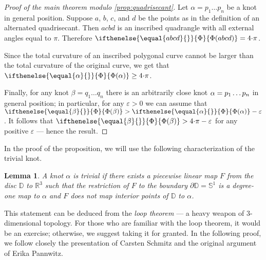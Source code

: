 \documentclass{article}
\newcommand*{\z}[1]{#1\nobreak\discretionary{}%
            {\hbox{$\mathsurround=0pt #1$}}{}}
\theoremstyle{theorem}
\newtheorem{Crofton-type formula}[theorem]{Crofton-type formula}
\newtheorem{Lemma}[theorem]{Lemma}
\newtheorem{Douglas--Rado theorem}[theorem]{Douglas--Rado theorem}
\newtheorem{Extended monotonicity theorem}[theorem]{Extended monotonicity theorem}
\theoremstyle{definition}
\def\DD{\mathbb{D}}
\def\RR{\mathbb{R}}
\newcommand*{\tc}[1]{\ifthenelse{\equal{#1}{}}{\Phi}{\Phi({#1})}}%
\def\eps{\varepsilon}
\begin{document}
\begin{proof}[Proof of the main theorem modulo \ref{prop:quadrisecant}]
Let $\alpha=p_1\dots p_n$ be a knot in general position.
Suppose $a$, $b$, $c$, and $d$ be the points as in the definition of an alternated quadrisecant.
Then $acbd$ is an inscribed quadrangle with all external angles equal to $\pi$.
Therefore $\tc{abcd}=4{\cdot}\pi$.

Since the total curvature of an inscribed polygonal curve cannot be larger than the total curvature of the original curve, we get that $\tc{\alpha}\z\ge 4{\cdot}\pi$.

Finally, for any knot $\beta=q_1\dots q_n$ there is an arbitrarily close knot $\alpha\z=p_1\dots p_n$ in general position;
in particular, for any $\eps>0$ we can assume that $\tc{\beta}>\tc\alpha-\eps$.
It follows that $\tc{\beta}>4{\cdot}\pi-\eps$ for any positive $\eps$ --- hence the result.
\end{proof}

In the proof of the proposition, we will use the following characterization of the trivial knot.

\begin{Lemma}
A knot $\alpha$ is trivial if there exists a piecewise linear map $F$ from the disc $\DD$ to $\RR^3$ such that the  restriction of $F$ to the boundary $\partial\DD=\mathbb{S}^1$ is a degree-one map to $\alpha$ and $F$ does not map interior points of $\DD$ to $\alpha$.
\end{Lemma}

This statement can be deduced from  the \textit{loop theorem} --- a heavy weapon of 3-dimensional topology.
For those who are familiar with the loop theorem, it would be an exercise; otherwise, we suggest taking it for granted.
In the following proof, we follow closely the presentation of Carsten Schmitz \cite{schmitz} and the original argument of Erika Pannwitz.
\end{document}
